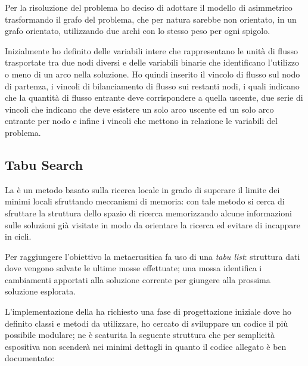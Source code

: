 Per la risoluzione del problema ho deciso di adottare il modello di  asimmetrico trasformando il grafo del problema, che per natura sarebbe non orientato, in un grafo orientato, utilizzando due archi con lo stesso peso per ogni spigolo.

Inizialmente ho definito delle variabili intere che rappresentano le unità di flusso trasportate tra due nodi diversi e delle variabili binarie che identificano l'utilizzo o meno di un arco nella soluzione.
Ho quindi inserito il vincolo di flusso sul nodo di partenza, i vincoli di bilanciamento di flusso sui restanti nodi, i quali indicano che la quantità di flusso entrante deve corrispondere a quella uscente, due serie di vincoli che indicano che deve esistere un solo arco uscente ed un solo arco entrante per nodo e infine i vincoli che mettono in relazione le variabili del problema.

\subsection{Tabu Search}
La \tabu è un metodo basato sulla ricerca locale in grado di superare il limite dei minimi locali sfruttando meccanismi di memoria: con tale metodo si cerca di sfruttare la struttura dello spazio di ricerca memorizzando alcune informazioni sulle soluzioni già visitate in modo da orientare la ricerca ed evitare di incappare in cicli.

Per raggiungere l'obiettivo la metaerusitica fa uso di una \emph{tabu list}: struttura dati dove vengono salvate le ultime mosse effettuate; una mossa identifica i cambiamenti apportati alla soluzione corrente per giungere alla prossima soluzione esplorata.

L'implementazione della \tabu ha richiesto una fase di progettazione iniziale dove ho definito classi e metodi da utilizzare, ho cercato di sviluppare un codice il più possibile modulare; ne è scaturita la seguente struttura che per semplicità espositiva non scenderà nei minimi dettagli in quanto il codice allegato è ben documentato:

